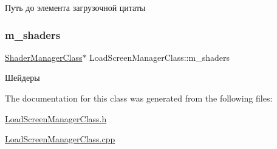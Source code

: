 Путь до элемента загрузочной цитаты 

\mbox{\label{class_load_screen_manager_class_ad305583a33b79d2f1ad7e9551f8197c7}} 
\subsubsection{\texorpdfstring{m\+\_\+shaders}{m\_shaders}}
{\footnotesize\ttfamily \hyperlink{class_shader_manager_class}{Shader\+Manager\+Class}$\ast$ Load\+Screen\+Manager\+Class\+::m\+\_\+shaders\hspace{0.3cm}{\ttfamily [private]}}



Шейдеры 



The documentation for this class was generated from the following files\+:\begin{DoxyCompactItemize}
\item 
\hyperlink{_load_screen_manager_class_8h}{Load\+Screen\+Manager\+Class.\+h}\item 
\hyperlink{_load_screen_manager_class_8cpp}{Load\+Screen\+Manager\+Class.\+cpp}\end{DoxyCompactItemize}
